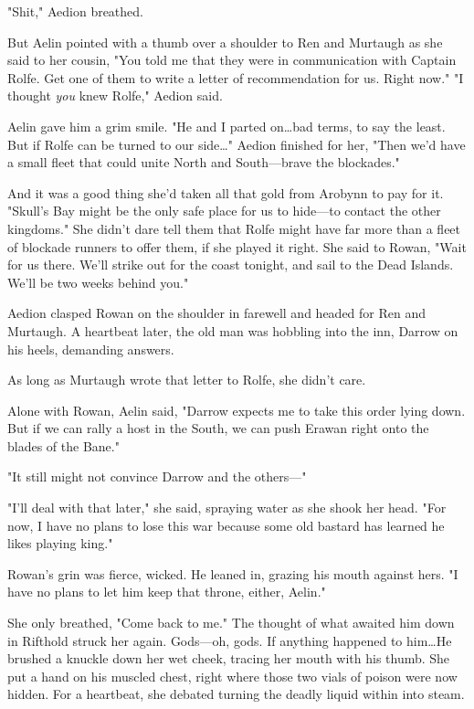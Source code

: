 "Shit," Aedion breathed.

But Aelin pointed with a thumb over a shoulder to Ren and Murtaugh as she said to her cousin, "You told me that they were in communication with Captain Rolfe.
Get one of them to write a letter of recommendation for us.
Right now."
"I thought \emph{you} knew Rolfe," Aedion said.

Aelin gave him a grim smile.
"He and I parted on\ldots bad terms, to say the least.
But if Rolfe can be turned to our side\ldots" Aedion finished for her, "Then we'd have a small fleet that could unite North and South---brave the blockades."

And it was a good thing she'd taken all that gold from Arobynn to pay for it.
"Skull's Bay might be the only safe place for us to hide---to contact the other kingdoms."
She didn't dare tell them that Rolfe might have far more than a fleet of blockade runners to offer them, if she played it right.
She said to Rowan, "Wait for us there.
We'll strike out for the coast tonight, and sail to the Dead Islands.
We'll be two weeks behind you."

Aedion clasped Rowan on the shoulder in farewell and headed for Ren and Murtaugh.
A heartbeat later, the old man was hobbling into the inn, Darrow on his heels, demanding answers.

As long as Murtaugh wrote that letter to Rolfe, she didn't care.

Alone with Rowan, Aelin said, "Darrow expects me to take this order lying down.
But if we can rally a host in the South, we can push Erawan right onto the blades of the Bane."

"It still might not convince Darrow and the others---"

"I'll deal with that later," she said, spraying water as she shook her head.
"For now, I have no plans to lose this war because some old bastard has learned he likes playing king."

Rowan's grin was fierce, wicked.
He leaned in, grazing his mouth against hers.
"I have no plans to let him keep that throne, either, Aelin."

She only breathed, "Come back to me."
The thought of what awaited him down in Rifthold struck her again.
Gods---oh, gods.
If anything happened to him\ldots He brushed a knuckle down her wet cheek, tracing her mouth with his thumb.
She put a hand on his muscled chest, right where those two vials of poison were now hidden.
For a heartbeat, she debated turning the deadly liquid within into steam.

